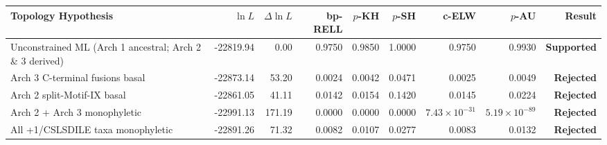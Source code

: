 \documentclass[10pt,letterpaper]{article}
\begin{document}
\vspace{6pt}
\vspace{3pt}
{\scriptsize\setlength{\tabcolsep}{2.8pt}\renewcommand{\arraystretch}{1.12}
\begin{longtable}{@{}lrrrrrrrr@{}}
\toprule
\textbf{Topology Hypothesis} & \textbf{$\ln L$} & \textbf{$\Delta\ln L$} & \textbf{bp-RELL} & \textbf{$p$-KH} & \textbf{$p$-SH} & \textbf{c-ELW} & \textbf{$p$-AU} & \textbf{Result} \\
\midrule
\endhead
\bottomrule
\endfoot
Unconstrained ML (Arch 1 ancestral; Arch 2 \& 3 derived) & -22819.94 & 0.00 & 0.9750 & 0.9850 & 1.0000 & 0.9750 & 0.9930 & \textbf{Supported} \\
Arch 3 C-terminal fusions basal & -22873.14 & 53.20 & 0.0024 & 0.0042 & 0.0471 & 0.0025 & 0.0049 & \textbf{Rejected} \\
Arch 2 split-Motif-IX basal & -22861.05 & 41.11 & 0.0142 & 0.0154 & 0.1420 & 0.0145 & 0.0224 & \textbf{Rejected} \\
Arch 2 + Arch 3 monophyletic & -22991.13 & 171.19 & 0.0000 & 0.0000 & 0.0000 & $7.43 \times 10^{-31}$ & $5.19 \times 10^{-89}$ & \textbf{Rejected} \\
All +1/CSLSDILE taxa monophyletic & -22891.26 & 71.32 & 0.0082 & 0.0107 & 0.0277 & 0.0083 & 0.0132 & \textbf{Rejected} \\
\end{longtable}
}

\newpage
\end{document}
